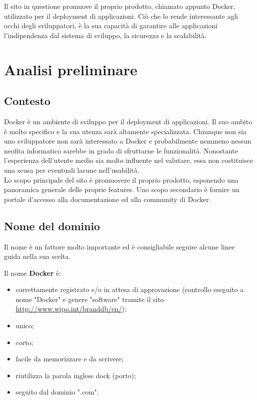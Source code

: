 \documentclass[a4paper]{article}
\begin{document}
\noindent Il sito in questione promuove il proprio prodotto, chiamato appunto Docker, utilizzato per il deployment di applicazioni. Ciò che lo rende interessante agli occhi degli sviluppatori, è la sua capacità di garantire alle applicazioni l'indipendenza dal sistema di sviluppo, la sicurezza e la scalabilità.

\section{Analisi preliminare}

\subsection{Contesto}
Docker è un ambiente di sviluppo per il deployment di applicazioni.
Il suo ambito è molto specifico e la sua utenza sarà altamente specializzata. Chiunque non sia uno sviluppatore non sarà interessato a Docker e probabilmente nemmeno nessun neofita informatico sarebbe in grado di sfruttarne le funzionalità. Nonostante l'esperienza dell'utente medio sia molto influente nel valutare, essa non costituisce una scusa per eventuali lacune nell'usabilità.
\\
Lo scopo principale del sito è promuovere il proprio prodotto, esponendo una panoramica generale delle proprie features. Uno scopo secondario è fornire un portale d'accesso alla documentazione ed alla community di Docker.

\subsection{Nome del dominio}
Il nome è un fattore molto importante ed è consigliabile seguire alcune linee guida nella sua scelta.

Il nome \textbf{Docker} è:
\begin{itemize}
	\item correttamente registrato e/o in attesa di approvazione (controllo eseguito a nome "Docker" e genere "software" tramite il sito \url{http://www.wipo.int/branddb/en/});
    \item unico;
    \item corto;
    \item facile da memorizzare e da scrivere;
    \item riutilizza la parola inglese dock (porto);
    \item seguito dal dominio ".com".
\end{itemize}
\end{document}
